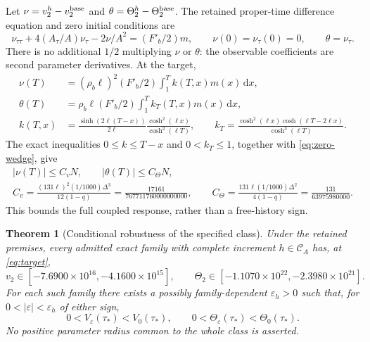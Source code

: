 \documentclass[11pt]{article}
\newcommand{\eps}{\varepsilon}
\newcommand{\dd}{\mathrm d}
\newtheorem{theorem}{Theorem}
\begin{document}
Let $\nu=v_2^h-v_2^{\rm base}$ and
$\theta=\Theta_2^h-\Theta_2^{\rm base}$. The retained proper-time
difference equation and zero initial conditions are
\begin{equation}
 \nu_{\tau\tau}+4(A_\tau/A)\nu_\tau-2\nu/A^2=(F'_b/2)m,
 \qquad \nu(0)=\nu_\tau(0)=0,\qquad \theta=\nu_\tau.
 \label{eq:volumeode}
\end{equation}
There is no additional $1/2$ multiplying $\nu$ or $\theta$: the
observable coefficients are second parameter derivatives. At the target,
\begin{align}
 \nu(T)&=(\rho_b\ell)^2(F'_b/2)\int_1^T k(T,x)m(x)\,\dd x,\nonumber\\
 \theta(T)&=\rho_b\ell(F'_b/2)\int_1^T k_T(T,x)m(x)\,\dd x,\nonumber\\
 k(T,x)&=\frac{\sinh(2\ell(T-x))}{2\ell}
                   \frac{\cosh^2(\ell x)}{\cosh^2(\ell T)},\qquad
 k_T=\frac{\cosh^2(\ell x)\cosh(\ell T-2\ell x)}{\cosh^3(\ell T)}.
 \label{eq:kernels}
\end{align}
The exact inequalities $0\le k\le T-x$ and $0<k_T\le1$, together with
\eqref{eq:zero-wedge}, give
\begin{equation}
 \begin{gathered}
 |\nu(T)|\le C_vN,\qquad |\theta(T)|\le C_\Theta N,\\
 C_v=\frac{(131\ell)^2(1/1000)\Delta^3}{12(1-q)}
     =\frac{17161}{767711760000000000},\qquad
 C_\Theta=\frac{131\ell(1/1000)\Delta^2}{4(1-q)}
     =\frac{131}{63975980000}.
 \end{gathered}
 \label{eq:transport}
\end{equation}
This bounds the full coupled response, rather than a free-history sign.

\begin{theorem}[Conditional robustness of the specified class]\label{thm:main}
Under the retained premises, every admitted exact family with complete
increment $h\in\mathcal C_A$ has, at \eqref{eq:target},
\begin{equation}
 v_2\in[-7.6900\times10^{16},-4.1600\times10^{15}],\qquad
 \Theta_2\in[-1.1070\times10^{22},-2.3980\times10^{21}].
 \label{eq:mainbounds}
\end{equation}
For each such family there exists a possibly family-dependent
$\eps_h>0$ such that, for $0<|\eps|<\eps_h$ of either sign,
\begin{equation}
 0<V_\eps(\tau_*)<V_0(\tau_*),\qquad
 0<\Theta_\eps(\tau_*)<\Theta_0(\tau_*).
 \label{eq:qualitative}
\end{equation}
No positive parameter radius common to the whole class is asserted.
\end{theorem}
\end{document}
